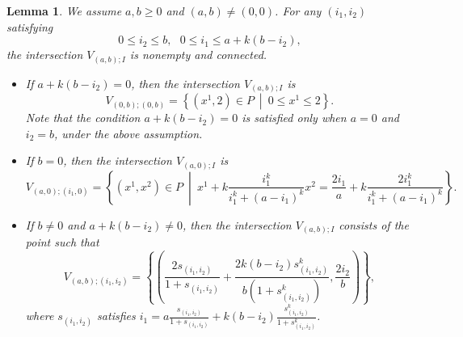 \documentclass[12pt,reqno]{amsart}
\newtheorem{lem}[thm]{Lemma}%
\theoremstyle{definition}
\begin{document}
\begin{lem}
We assume $a,b\geq0$ and $(a,b)\neq(0,0)$. For any $(i_1,i_2)$ satisfying
\begin{equation*}
0\leq i_2\leq b,\ \ \ 0\leq i_1\leq a+k(b-i_2),
\end{equation*}
the intersection $V_{(a,b);I}$ is nonempty and connected.
\begin{itemize}
\item If $a+k(b-i_2)=0$, then the intersection $V_{(a,b);I}$ is
\begin{equation*}
V_{(0,b);(0,b)} =\left\{ \left( x^1 , 2 \right)\in P\ \middle|\ 0\leq x^1\leq 2\right\}.
\end{equation*}
Note that the condition $a+k(b-i_2)=0$ is satisfied only when $a=0$ and $i_2=b$, under the above assumption.

\item If $b=0$, then the intersection $V_{(a,0);I}$ is
\begin{equation*}
V_{(a,0);(i_1,0)} = \left\{(x^1,x^2)\in P\ \middle|\  x^1+k\frac{i_1^k}{i_1^k+(a-i_1)^k}x^2=\frac{2i_1}{a}+k\frac{2i_1^k}{i_1^k+(a-i_1)^k}\right\}.
\end{equation*}

\item If $b\neq0$ and $a+k(b-i_2)\neq0$, then the intersection $V_{(a,b);I}$ consists of the point such that
\begin{equation*}
V_{(a,b);(i_1,i_2)} = \left\{\left(\frac{2s_{(i_1,i_2)}}{1+s_{(i_1,i_2)}}+\frac{2k(b-i_2)s_{(i_1,i_2)}^k}{b(1+s_{(i_1,i_2)}^k)},\frac{2i_2}{b}\right)\right\},
\end{equation*}
where $s_{(i_1,i_2)}$ satisfies $i_1=a\frac{s_{(i_1,i_2)}}{1+s_{(i_1,i_2)}}+k(b-i_2)\frac{s_{(i_1,i_2)}^k}{1+s_{(i_1,i_2)}^k}$.
\end{itemize}
\end{lem}
\end{document}
